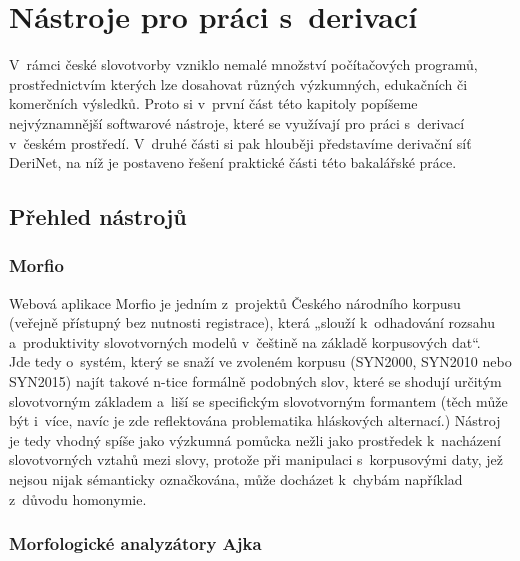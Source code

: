 \hypertarget{nuxe1stroje-pro-pruxe1ci-s-derivacuxed}{%
\chapter{Nástroje pro práci
s~derivací}\label{nuxe1stroje-pro-pruxe1ci-s-derivacuxed}}

V~rámci české slovotvorby vzniklo nemalé množství počítačových programů,
prostřednictvím kterých lze dosahovat různých výzkumných, edukačních či
komerčních výsledků. Proto si v~první část této kapitoly popíšeme
nejvýznamnější softwarové nástroje, které se využívají pro práci
s~derivací v~českém prostředí. V~druhé části si pak hlouběji představíme
derivační síť DeriNet, na níž je postaveno řešení praktické části této
bakalářské práce.

\hypertarget{pux159ehled-nuxe1strojux16f}{%
\section{Přehled nástrojů}\label{pux159ehled-nuxe1strojux16f}}

\hypertarget{morfio}{%
\subsection{Morfio}\label{morfio}}

Webová aplikace Morfio je jedním z~projektů Českého národního korpusu
(veřejně přístupný bez nutnosti registrace), která „slouží k~odhadování
rozsahu a~produktivity slovotvorných modelů v~češtině na základě
korpusových dat``.~\parencite{cvrcek13} Jde tedy o~systém, který se
snaží ve zvoleném korpusu (SYN2000, SYN2010 nebo SYN2015) najít takové
n-tice formálně podobných slov, které se shodují určitým slovotvorným
základem a~liší se specifickým slovotvorným formantem (těch může být
i~více, navíc je zde reflektována problematika hláskových alternací.)
Nástroj je tedy vhodný spíše jako výzkumná pomůcka nežli jako prostředek
k~nacházení slovotvorných vztahů mezi slovy, protože při manipulaci
s~korpusovými daty, jež nejsou nijak sémanticky označkována, může docházet
k~chybám například z~důvodu homonymie.~\parencite{cvrcek13}

\hypertarget{morfologickuxe9-analyzuxe1tory-ajka}{%
\subsection{Morfologické analyzátory
Ajka}\label{morfologickuxe9-analyzuxe1tory-ajka}}

